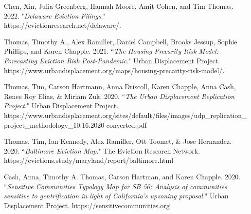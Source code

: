 \begin{cvparagraph}

Chen, Xin, Julia Greenberg, Hannah Moore, Amit Cohen, and Tim Thomas. 2022. "\emph{Delaware Eviction Filings}."\\
https://evictionresearch.net/delaware/. 
\end{cvparagraph}

\begin{cvparagraph}

Thomas, Timothy A., Alex Ramiller, Daniel Campbell, Brooks Jessup, Sophie Phillips, and Karen Chapple. 2021. “\emph{The Housing Precarity Risk Model: Forecasting Eviction Risk Post-Pandemic}." Urban Displacement Project. https://www.urbandisplacement.org/maps/housing-precarity-risk-model/.
\end{cvparagraph}

\begin{cvparagraph}

Thomas, Tim, Carson Hartmann, Anna Driscoll, Karen Chapple, Anna Cash, Renee Roy Elias, \& Miriam Zuk. 2020. “\emph{The Urban Displacement Replication Project}." Urban Displacement Project.\\
https://www.urbandisplacement.org/sites/default/files/images/udp\_replication\_project\_methodology\_10.16.2020-converted.pdf
\end{cvparagraph}

\begin{cvparagraph}

Thomas, Tim, Ian Kennedy, Alex Ramiller, Ott Toomet, \& Jose Hernandez. 2020. “\emph{Baltimore Eviction Map}." The Eviction Research Network.\\
https://evictions.study/maryland/report/baltimore.html
\end{cvparagraph}

\begin{cvparagraph}

Cash, Anna, Timothy A. Thomas, Carson Hartman, and Karen Chapple. 2020. “\emph{Sensitive Communities Typology Map for SB 50: Analysis of communities sensitive to gentrification in light of California's upzoning proposal}." Urban Displacement Project. https://sensitivecommunities.org
\end{cvparagraph}

